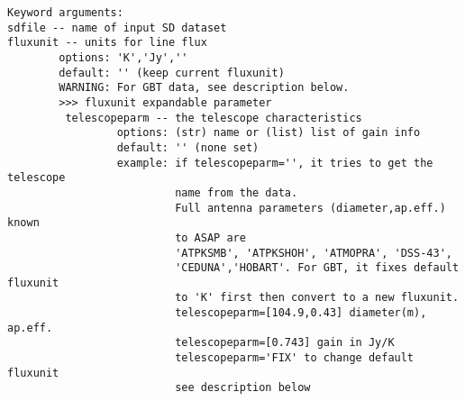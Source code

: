 \begin{verbatim}
Keyword arguments:
sdfile -- name of input SD dataset
fluxunit -- units for line flux
        options: 'K','Jy',''
        default: '' (keep current fluxunit)
        WARNING: For GBT data, see description below.
        >>> fluxunit expandable parameter
         telescopeparm -- the telescope characteristics
                 options: (str) name or (list) list of gain info
                 default: '' (none set)
                 example: if telescopeparm='', it tries to get the telescope
                          name from the data.
                          Full antenna parameters (diameter,ap.eff.) known
                          to ASAP are
                          'ATPKSMB', 'ATPKSHOH', 'ATMOPRA', 'DSS-43',
                          'CEDUNA','HOBART'. For GBT, it fixes default fluxunit
                          to 'K' first then convert to a new fluxunit.
                          telescopeparm=[104.9,0.43] diameter(m), ap.eff.
                          telescopeparm=[0.743] gain in Jy/K
                          telescopeparm='FIX' to change default fluxunit
                          see description below


\end{verbatim}
